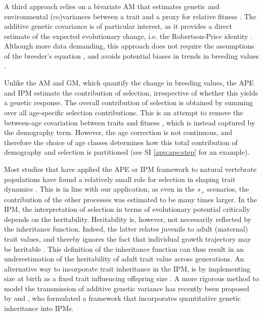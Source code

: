 A third approach relies on a bivariate AM that estimates genetic and environmental (co)variances between a trait and a proxy for relative fitness \parencite{Lande1979,Lynch2014}. The additive genetic covariance is of particular interest, as it provides a direct estimate of the expected evolutionary change, i.e. the Robertson-Price identity \parencite{Robertson1966,Price1970,Lynch1998}. Although more data demanding, this approach does not require the assumptions of the breeder's equation \parencite{Morrissey2012}, and avoids potential biases in trends in breeding values \parencite{Postma2006}.

Unlike the AM and GM, which quantify the change in breeding values, the APE and IPM estimate the contribution of selection, irrespective of whether this yields a genetic response. The overall contribution of selection is obtained by summing over all age-specific selection contributions. This is an attempt to remove the between-age covariation between traits and fitness \parencite{engen2014b}, which is instead captured by the demography term. However, the age correction is not continuous, and therefore the choice of age classes determines how this total contribution of demography and selection is partitioned (see SI \ref{app:ape:step} for an example).

Most studies that have applied the APE or IPM framework to natural vertebrate populations have found a relatively small role for selection in shaping trait dynamics \parencite[e.g.][]{Ozgul2009,traill2014demography}. This is in line with our application, as even in the $s_+$ scenarios, the contribution of the other processes was estimated to be many times larger. In the IPM, the interpretation of selection in terms of evolutionary potential critically depends on the heritability. Heritability is, however, not necessarily reflected by the inheritance function. Indeed, the latter relates juvenile to adult (maternal) trait values, and thereby ignores the fact that individual growth trajectory may be heritable \parencite{chevin2015}. This definition of the inheritance function can thus result in an underestimation of the heritability of adult trait value across generations. An alternative way to incorporate trait inheritance in the IPM, is by implementing  size at birth as a fixed trait influencing offspring size \parencite{vindenes2015}. A more rigorous method to model the transmission of additive genetic variance has recently been proposed by \cite{Coulson2015} and \cite{Childs2016}, who formulated a framework that incorporates quantitative genetic inheritance into IPMs.

